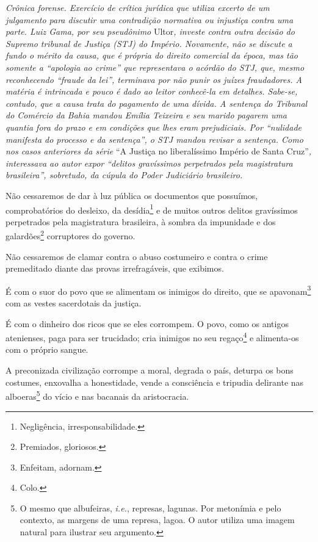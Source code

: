 \emph{Crônica forense. Exercício de crítica jurídica que utiliza excerto
de um julgamento para discutir uma contradição normativa ou injustiça
contra uma parte. Luiz Gama, por seu pseudônimo} Ultor\emph{, investe
contra outra decisão do Supremo tribunal de Justiça (STJ) do Império.
Novamente, não se discute a fundo o mérito da causa, que é própria do
direito comercial da época, mas tão somente a ``apologia ao crime'' que
representava o acórdão do STJ, que, mesmo reconhecendo ``fraude da lei'',
terminava por não punir os juízes fraudadores. A matéria é intrincada e
pouco é dado ao leitor conhecê-la em detalhes. Sabe-se, contudo, que a
causa trata do pagamento de uma dívida. A sentença do Tribunal do
Comércio da Bahia mandou Emília Teixeira e seu marido pagarem uma
quantia fora do prazo e em condições que lhes eram prejudiciais. Por
``nulidade manifesta do processo e da sentença'', o STJ mandou revisar a
sentença. Como nos casos anteriores da série} ``A Justiça no
liberalíssimo Império de Santa Cruz''\emph{, interessava ao autor expor
``delitos gravíssimos perpetrados pela magistratura brasileira'',
sobretudo, da cúpula do Poder Judiciário brasileiro.}

\asterisc{}

Não cessaremos de dar à luz pública os documentos que possuímos,
comprobatórios do desleixo, da desídia\footnote{Negligência,
  irresponsabilidade.} e de muitos outros delitos gravíssimos
perpetrados pela magistratura brasileira, à sombra da impunidade e dos
galardões\footnote{Premiados, gloriosos.} corruptores do governo.

Não cessaremos de clamar contra o abuso costumeiro e contra o crime
premeditado diante das provas irrefragáveis, que exibimos.

É com o suor do povo que se alimentam os inimigos do direito, que se
apavonam\footnote{Enfeitam, adornam.} com as vestes sacerdotais da
justiça.

É com o dinheiro dos ricos que se eles corrompem. O povo, como os
antigos atenienses, paga para ser trucidado; cria inimigos no seu
regaço\footnote{Colo.} e alimenta-os com o próprio sangue.

A preconizada civilização corrompe a moral, degrada o país, deturpa os
bons costumes, enxovalha a honestidade, vende a consciência e tripudia
delirante nas alboeras\footnote{ O mesmo que albufeiras,
  \emph{i.e.}, represas, lagunas. Por metonímia e pelo contexto, as
  margens de uma represa, lagoa. O autor utiliza uma imagem natural para
  ilustrar seu argumento.} do vício e nas bacanais da aristocracia.

